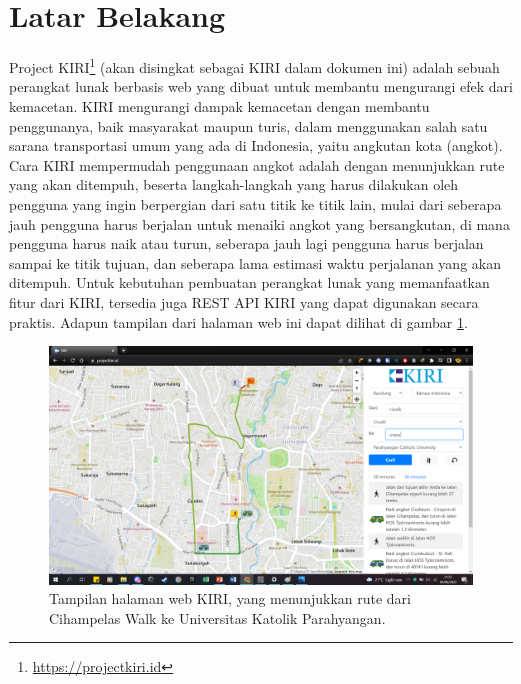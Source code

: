\documentclass[a4paper,twoside]{article}
\begin{document}
\section{Latar Belakang}
\label{sec:label}
Project KIRI\footnote{\href{https://projectkiri.id}{https://projectkiri.id}} (akan disingkat sebagai KIRI dalam dokumen ini) adalah sebuah perangkat lunak berbasis web yang dibuat untuk \mbox{membantu} mengurangi efek dari kemacetan. KIRI mengurangi dampak kemacetan dengan membantu penggunanya, baik \mbox{masyarakat} maupun turis, dalam menggunakan salah satu sarana transportasi umum yang ada di Indonesia, yaitu angkutan kota (angkot). Cara KIRI \mbox{mempermudah} penggunaan angkot adalah dengan menunjukkan rute yang akan ditempuh, beserta langkah-langkah yang harus dilakukan oleh pengguna yang ingin berpergian dari satu titik ke titik lain, mulai dari seberapa jauh pengguna harus berjalan untuk menaiki angkot yang bersangkutan, di mana pengguna harus naik atau turun, seberapa jauh lagi pengguna harus berjalan sampai ke titik tujuan, dan seberapa lama estimasi waktu perjalanan yang akan ditempuh. Untuk kebutuhan pembuatan perangkat lunak yang memanfaatkan fitur dari KIRI, tersedia juga REST API KIRI yang dapat digunakan secara praktis. Adapun tampilan dari halaman web ini dapat dilihat di gambar \ref{fig:kiri-page}. 
\vspace{\baselineskip}
\begin{figure}[ht]
    \centering
    \includegraphics[width=0.74\linewidth]{projectkiri-example}
    \caption[Tampilan halaman web KIRI]{Tampilan halaman web KIRI, yang menunjukkan rute dari Cihampelas Walk ke Universitas Katolik Parahyangan.}
    \label{fig:kiri-page}
\end{figure}
\end{document}
